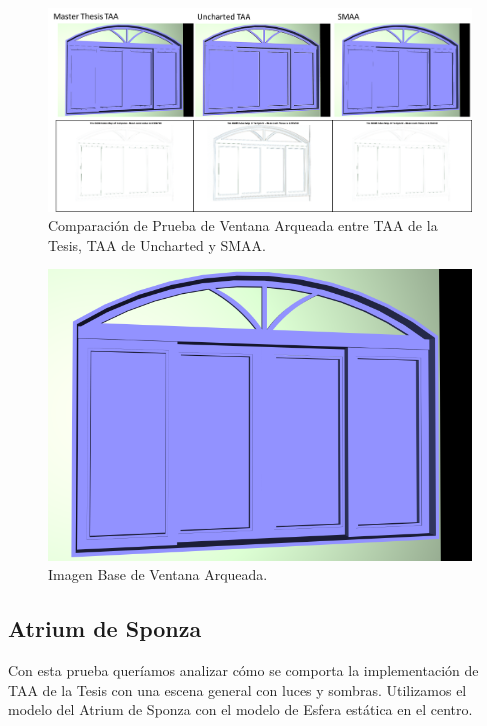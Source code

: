 \documentclass[pregrado]{tesis-usb} %
\begin{document}
\begin{figure}[!htb]
	\centering
	\includegraphics[scale=0.8]{images/results/window_arch.png}
	\caption{Comparación de Prueba de Ventana Arqueada entre TAA de la Tesis, TAA de Uncharted y SMAA.}\label{fig:window_arch_render}
\end{figure}

\begin{figure}[!htb]
	\centering
	\includegraphics[scale=0.18]{images/results/window_arch_sobel_ground_truth.png}
	\caption{Imagen Base de Ventana Arqueada.}\label{fig:window_arch_truth}
\end{figure}

\FloatBarrier

\subsection{Atrium de Sponza}
Con esta prueba queríamos analizar cómo se comporta la implementación de TAA de la Tesis con una escena general con luces y sombras. Utilizamos el modelo del Atrium de Sponza con el modelo de Esfera estática en el centro.
\end{document}
